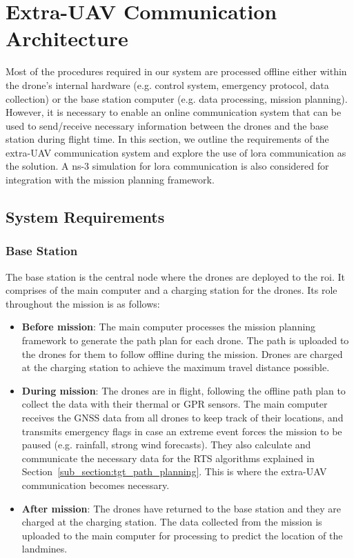 \newpage
{}
\section{Extra-UAV Communication Architecture} \label{sec:euc}

Most of the procedures required in our system are processed offline either within the drone's internal hardware (e.g. control system, emergency protocol, data collection) or the base station computer (e.g. data processing, mission planning). However, it is necessary to enable an online communication system that can be used to send/receive necessary information between the drones and the base station during flight time. In this section, we outline the requirements of the extra-\gls{UAV} communication system and explore the use of \gls{lora} communication as the solution. A ns-3 simulation for \gls{lora} communication is also considered for integration with the mission planning framework. 

\subsection{System Requirements}
\label{sec:euc_requirements}

\subsubsection{Base Station}

The base station is the central node where the drones are deployed to the \gls{roi}. It comprises of the main computer and a charging station for the drones. Its role throughout the mission is as follows:

\begin{itemize}
    \item \textbf{Before mission}: The main computer processes the mission planning framework to generate the path plan for each drone. The path is uploaded to the drones for them to follow offline during the mission. Drones are charged at the charging station to achieve the maximum travel distance possible. 
    \item \textbf{During mission}: The drones are in flight, following the offline path plan to collect the data with their thermal or \gls{GPR} sensors. The main computer receives the \gls{GNSS} data from all drones to keep track of their locations, and transmits emergency flags in case an extreme event forces the mission to be paused (e.g. rainfall, strong wind forecasts). They also calculate and communicate the necessary data for the \gls{RTS} algorithms explained in Section~\ref{sub_section:tgt_path_planning}. This is where the extra-\gls{UAV} communication becomes necessary. 
    \item \textbf{After mission}: The drones have returned to the base station and they are charged at the charging station. The data collected from the mission is uploaded to the main computer for processing to predict the location of the landmines. 
\end{itemize}

